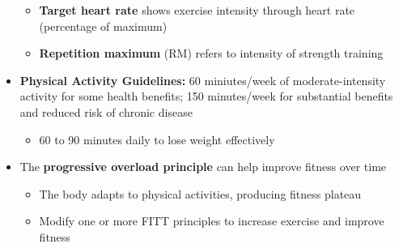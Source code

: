 \documentclass[12pt]{article}
\begin{document}
\begin{itemize}
\begin{itemize}
                        \item \textbf{Target heart rate} shows exercise intensity through heart rate (percentage of maximum)
                        \item \textbf{Repetition maximum} (RM) refers to intensity of strength training
                    \end{itemize}
                \item \textbf{Physical Activity Guidelines:} 60 miniutes/week of moderate-intensity activity for some health benefits; 150 minutes/week for substantial benefits and reduced risk of chronic disease
                    \begin{itemize}
                        \item 60 to 90 minutes daily to lose weight effectively
                    \end{itemize}
                \item The \textbf{progressive overload principle} can help improve fitness over time
                    \begin{itemize}
                        \item The body adapts to physical activities, producing fitness plateau
                        \item Modify one or more FITT principles to increase exercise and improve fitness
                    \end{itemize}
            \end{itemize}
\end{document}
